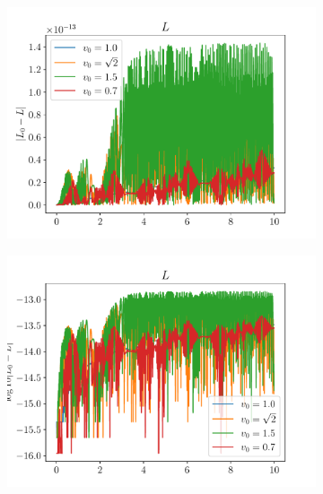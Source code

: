 \begin{figure}
\begin{subfigure}{0.48\textwidth}
        \includegraphics[width=\textwidth]{../images/1-1-L_lin.pdf}
    \end{subfigure}
    \hfill
    \begin{subfigure}{0.48\textwidth}
        \includegraphics[width=\textwidth]{../images/1-1-L_log.pdf}
    \end{subfigure}
    \newline


\end{figure}
